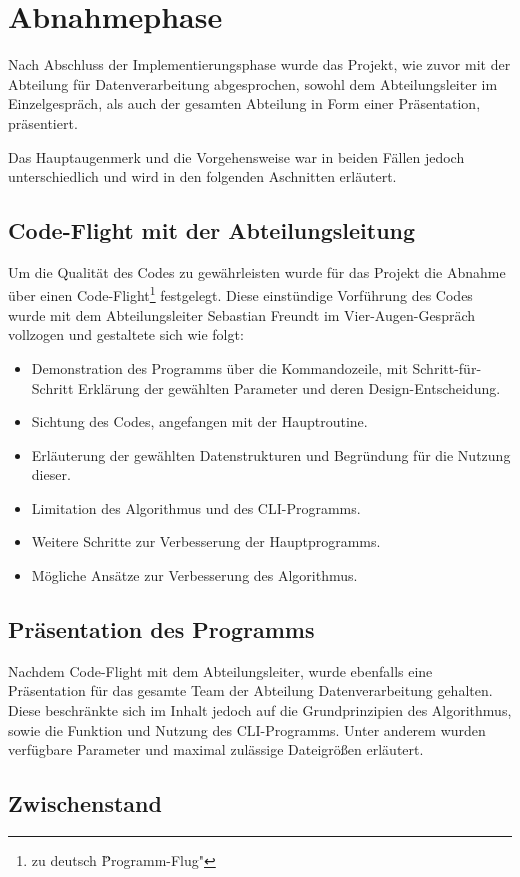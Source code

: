 \section{Abnahmephase}
Nach Abschluss der Implementierungsphase wurde das Projekt, wie zuvor mit der
Abteilung für Datenverarbeitung abgesprochen, sowohl dem Abteilungsleiter im Einzelgespräch,
als auch der gesamten Abteilung in Form einer Präsentation, präsentiert.

Das Hauptaugenmerk und die Vorgehensweise war in beiden Fällen jedoch unterschiedlich
und wird in den folgenden Aschnitten erläutert.

\subsection{Code-Flight mit der Abteilungsleitung}

Um die Qualität des Codes zu gewährleisten wurde für das Projekt die Abnahme über einen Code-Flight\footnote{zu deutsch \"Programm-Flug"} festgelegt. Diese einstündige
Vorführung des Codes wurde mit dem Abteilungsleiter Sebastian Freundt im
Vier-Augen-Gespräch vollzogen und gestaltete sich wie folgt:

\begin{itemize}
    \item Demonstration des Programms über die Kommandozeile, mit Schritt-für-Schritt Erklärung der gewählten Parameter und deren Design-Entscheidung.
    \item Sichtung des Codes, angefangen mit der Hauptroutine.
    \item Erläuterung der gewählten Datenstrukturen und Begründung für die Nutzung dieser.
    \item Limitation des Algorithmus und des CLI-Programms.
    \item Weitere Schritte zur Verbesserung der Hauptprogramms.
    \item Mögliche Ansätze zur Verbesserung des Algorithmus.
\end{itemize}

\subsection{Präsentation des Programms}

Nachdem Code-Flight mit dem Abteilungsleiter, wurde ebenfalls
eine Präsentation für das gesamte Team der Abteilung Datenverarbeitung gehalten.
Diese beschränkte sich im Inhalt jedoch auf die Grundprinzipien des Algorithmus, sowie
die Funktion und Nutzung des CLI-Programms. Unter anderem wurden verfügbare
Parameter und maximal zulässige Dateigrößen erläutert.

\subsection{Zwischenstand}
